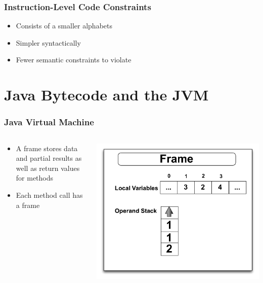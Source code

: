 \documentclass{beamer}
\begin{document}
\begin{frame}
	\frametitle{Instruction-Level Code Constraints}
	\begin{itemize}
		\item Consists of a smaller alphabets
		\item Simpler syntactically
		\item Fewer semantic constraints to violate
	\end{itemize}		

\end{frame}




\section[Bytecode and Assembly]{Java Bytecode and the JVM}

\begin{frame}
	\frametitle{Java Virtual Machine}
\begin{columns}
\begin{column}{0.5\textwidth}
\begin{itemize}	
\item A frame stores data and partial results as well as return values for methods
\item Each method call has a frame

\end{itemize}
\end{column}
\begin{column}{0.5\textwidth}
\includegraphics[width=1\textwidth]{Illustrations/frame.pdf}
\end{column}
\end{columns}



\end{frame}
\end{document}
